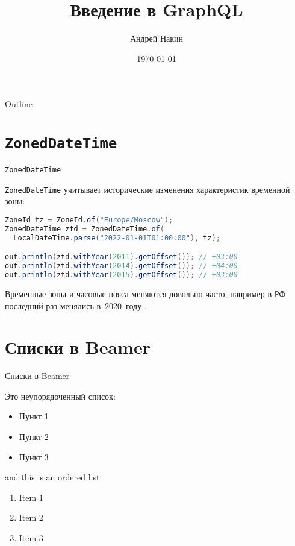 \documentclass{beamer}
\title{Введение в GraphQL}
\author{Андрей Накин}
\date{\today}
\begin{document}
\begin{frame}
    \titlepage 
\end{frame}



\begin{frame}{Outline}
    \tableofcontents
\end{frame}


\section{{\tt ZonedDateTime}}

\begin{frame}[fragile]{{\tt ZonedDateTime}}

{\tt ZonedDateTime} учитывает исторические изменения характеристик временной зоны:
\bigskip

\begin{lstlisting}[language=java]
ZoneId tz = ZoneId.of("Europe/Moscow");
ZonedDateTime ztd = ZonedDateTime.of(
  LocalDateTime.parse("2022-01-01T01:00:00"), tz);

out.println(ztd.withYear(2011).getOffset()); // +03:00
out.println(ztd.withYear(2014).getOffset()); // +04:00
out.println(ztd.withYear(2015).getOffset()); // +03:00
\end{lstlisting}

Временные зоны и часовые пояса меняются довольно часто, например в РФ последний раз менялись в~2020~году \cite{dst_news}.

\end{frame}

\section{Списки в Beamer}
\begin{frame}{Списки в Beamer}

Это неупорядоченный список:
\begin{itemize}
    \item Пункт 1
    \item Пункт 2
    \item Пункт 3
\end{itemize}

and this is an ordered list:
\begin{enumerate}
    \item Item 1
    \item Item 2
    \item Item 3
\end{enumerate}

\end{frame}
\end{document}
